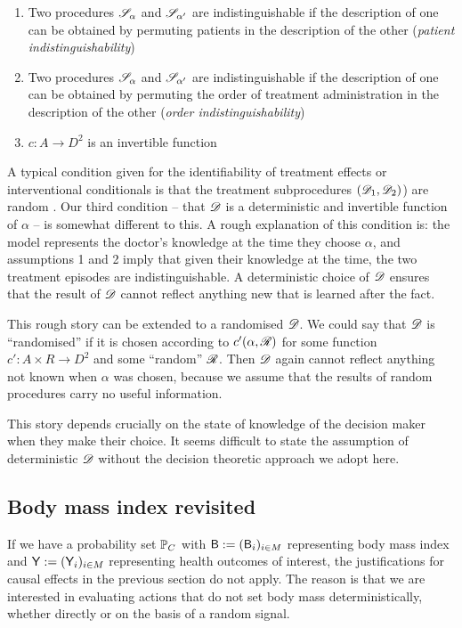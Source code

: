 \begin{enumerate}
    \item Two procedures $\mathscr{S}_\alpha$ and $\mathscr{S}_{\alpha'}$ are indistinguishable if the description of one can be obtained by permuting patients in the description of the other (\emph{patient indistinguishability})
    \item Two procedures $\mathscr{S}_\alpha$ and $\mathscr{S}_{\alpha'}$ are indistinguishable if the description of one can be obtained by permuting the order of treatment administration in the description of the other (\emph{order indistinguishability})
    \item $c:A\to D^2$ is an invertible function
\end{enumerate}

A typical condition given for the identifiability of treatment effects or interventional conditionals is that the treatment subprocedures $(\mathscr{D}_1,\mathscr{D}_2)$) are random \citep{rubin_causal_2005}. Our third condition -- that $\mathscr{D}$ is a deterministic and invertible function of $\alpha$ -- is somewhat different to this. A rough explanation of this condition is: the model represents the doctor's knowledge at the time they choose $\alpha$, and assumptions 1 and 2 imply that given their knowledge at the time, the two treatment episodes are indistinguishable. A deterministic choice of $\mathscr{D}$ ensures that the result of $\mathscr{D}$ cannot reflect anything new that is learned after the fact.

This rough story can be extended to a randomised $\mathscr{D}$. We could say that $\mathscr{D}$ is ``randomised'' if it is chosen according to $c'(\alpha,\mathscr{R})$ for some function $c':A\times R\to D^2$ and some ``random'' $\mathscr{R}$. Then $\mathscr{D}$ again cannot reflect anything not known when $\alpha$ was chosen, because we assume that the results of random procedures carry no useful information.

This story depends crucially on the state of knowledge of the decision maker when they make their choice. It seems difficult to state the assumption of deterministic $\mathscr{D}$ without the decision theoretic approach we adopt here.


\subsection{Body mass index revisited}

If we have a probability set $\mathbb{P}_C$ with $\mathsf{B}:=(\mathsf{B}_i)_{i\in M}$ representing body mass index and $\mathsf{Y}:=(\mathsf{Y}_i)_{i\in M}$ representing health outcomes of interest, the justifications for causal effects in the previous section do not apply. The reason is that we are interested in evaluating actions that do not set body mass deterministically, whether directly or on the basis of a random signal.


